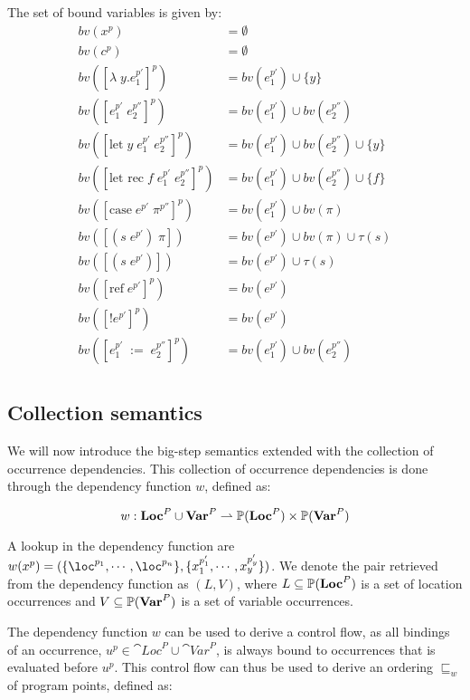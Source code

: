 \documentclass[../../master.tex]{subfiles}
\begin{document}
\begin{definition}\label{def:bv}
	The set of bound variables is given by:
	\begin{align*}
		bv(x^p)&=\emptyset\\
		bv(c^p)&=\emptyset\\
		bv([\lambda\;y.e_1^{p'}]^p)&=bv(e_1^{p'})\cup\{y\}\\
		bv([e_1^{p'}\;e_2^{p''}]^p)&=bv(e_1^{p'})\cup bv(e_2^{p''})\\
		bv([\mbox{let}\;y\;e_1^{p'}\;e_2^{p''}]^p)&=bv(e_1^{p'})\cup bv(e_2^{p''})\cup\{y\}\\
		bv([\mbox{let rec}\;f\;e_1^{p'}\;e_2^{p''}]^p)&=bv(e_1^{p'})\cup bv(e_2^{p''})\cup\{f\}\\
		bv([\mbox{case}\;e^{p'}\;\pi^{p''}]^p)&=bv(e_1^{p'})\cup bv(\pi)\\
		bv([(s\;e^{p'})\;\pi])&=bv(e^{p'})\cup bv(\pi)\cup\tau(s)\\
		bv([(s\;e^{p'})])&=bv(e^{p'})\cup\tau(s)\\
		bv([\mbox{ref}\;e^{p'}]^p)&=bv(e^{p'})\\
		bv([!e^{p'}]^p)&=bv(e^{p'})\\
		bv([e_1^{p'}\;:=\;e_2^{p''}]^p)&=bv(e_1^{p'})\cup bv(e_2^{p''})\\
	\end{align*}
\end{definition}

\subsection{Collection semantics}\label{sec:sem}
We will now introduce the big-step semantics extended with the collection of occurrence dependencies.
This collection of occurrence dependencies is done through the dependency function $w$, defined as:

$$w:\textbf{Loc}^P\cup\textbf{Var}^P\rightharpoonup\mathbb{P}(\textbf{Loc}^P)\times\mathbb{P}(\textbf{Var}^P)$$

A lookup in the dependency function are $w(x^p)=(\{\loc^{p_1},\cdots,\loc^{p_n}\},\{x_1^{p'_1},\cdots,x_y^{p'_y}\})$.
We denote the pair retrieved from the dependency function as $(L,V)$, where $L\subseteq\mathbb{P}(\textbf{Loc}^P)$ is a set of location occurrences and $V\subseteq\mathbb{P}(\textbf{Var}^P)$ is a set of variable occurrences.

The dependency function $w$ can be used to derive a control flow, as all bindings of an occurrence, $u^p\in\cat{Loc}^P\cup\cat{Var}^P$, is always bound to occurrences that is evaluated before $u^p$.
This control flow can thus be used to derive an ordering $\sqsubseteq_w$ of program points, defined as:
\end{document}

